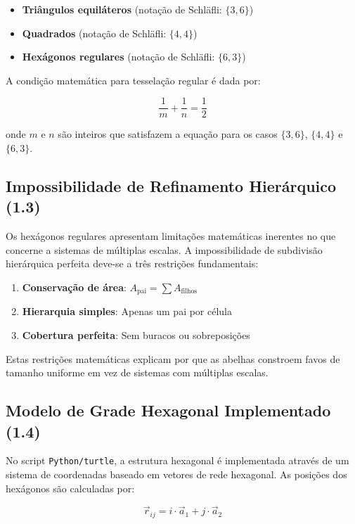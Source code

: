 \documentclass[12pt,a4paper,oneside]{extarticle}
\begin{document}
\begin{itemize}
    \item \textbf{Triângulos equiláteros} (notação de Schläfli: $\{3,6\}$)
    \item \textbf{Quadrados} (notação de Schläfli: $\{4,4\}$) 
    \item \textbf{Hexágonos regulares} (notação de Schläfli: $\{6,3\}$)
\end{itemize}

A condição matemática para tesselação regular é dada por:

\begin{equation}
\frac{1}{m} + \frac{1}{n} = \frac{1}{2}
\label{eq:tessellation_condition}
\end{equation}

onde $m$ e $n$ são inteiros que satisfazem a equação para os casos $\{3,6\}$, $\{4,4\}$ e $\{6,3\}$.

\subsection{Impossibilidade de Refinamento Hierárquico (1.3)}
Os hexágonos regulares apresentam limitações matemáticas inerentes no que concerne a sistemas de múltiplas escalas. A impossibilidade de subdivisão hierárquica perfeita deve-se a três restrições fundamentais:

\begin{enumerate}
    \item \textbf{Conservação de área}: $A_{\text{pai}} = \sum A_{\text{filhos}}$
    \item \textbf{Hierarquia simples}: Apenas um pai por célula
    \item \textbf{Cobertura perfeita}: Sem buracos ou sobreposições
\end{enumerate}

Estas restrições matemáticas explicam por que as abelhas constroem favos de tamanho uniforme em vez de sistemas com múltiplas escalas.

\subsection{Modelo de Grade Hexagonal Implementado (1.4)}
No script \texttt{Python/turtle}, a estrutura hexagonal é implementada através de um sistema de coordenadas baseado em vetores de rede hexagonal. As posições dos hexágonos são calculadas por:

\begin{equation}
\vec{r}_{ij} = i \cdot \vec{a}_1 + j \cdot \vec{a}_2
\label{eq:hexagonal_grid}
\end{equation}
\end{document}
